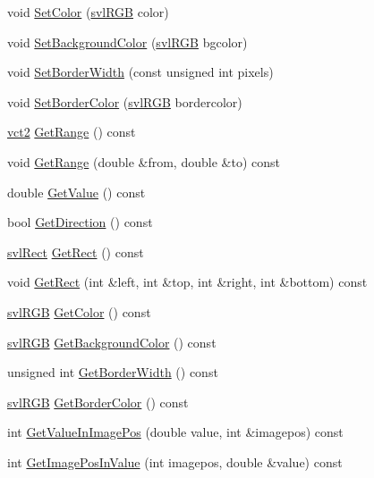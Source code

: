 \begin{DoxyCompactItemize}
\item 
void \hyperlink{classsvl_overlay_static_bar_a1742ec191bd0a3d669d50886f5001322}{Set\-Color} (\hyperlink{structsvl_r_g_b}{svl\-R\-G\-B} color)
\item 
void \hyperlink{classsvl_overlay_static_bar_afe51822052b88ee25f82c8c92978c2ff}{Set\-Background\-Color} (\hyperlink{structsvl_r_g_b}{svl\-R\-G\-B} bgcolor)
\item 
void \hyperlink{classsvl_overlay_static_bar_a49439436a1c7cf6fb6df040010a14a57}{Set\-Border\-Width} (const unsigned int pixels)
\item 
void \hyperlink{classsvl_overlay_static_bar_a1091a5db22ba4897ab10d8332fcfcae8}{Set\-Border\-Color} (\hyperlink{structsvl_r_g_b}{svl\-R\-G\-B} bordercolor)
\item 
\hyperlink{vct_fixed_size_vector_types_8h_a88481ac3c794867ba5e4e92624f0d958}{vct2} \hyperlink{classsvl_overlay_static_bar_a6652291c391a869141ecab8a2b34e559}{Get\-Range} () const 
\item 
void \hyperlink{classsvl_overlay_static_bar_a331674cb3f309f1f5e833bce5c9d7342}{Get\-Range} (double \&from, double \&to) const 
\item 
double \hyperlink{classsvl_overlay_static_bar_a98ed4083a0b9303dd0df841140e18a49}{Get\-Value} () const 
\item 
bool \hyperlink{classsvl_overlay_static_bar_a388519c550f3102ef0c7fbffe4afb1e9}{Get\-Direction} () const 
\item 
\hyperlink{structsvl_rect}{svl\-Rect} \hyperlink{classsvl_overlay_static_bar_afe7c2f05bfbf77fb571a9a75892cd8d1}{Get\-Rect} () const 
\item 
void \hyperlink{classsvl_overlay_static_bar_ad7e626e120a6b3a58b7b5b1f6f37e33c}{Get\-Rect} (int \&left, int \&top, int \&right, int \&bottom) const 
\item 
\hyperlink{structsvl_r_g_b}{svl\-R\-G\-B} \hyperlink{classsvl_overlay_static_bar_a7da9a6ec2e95cfc0c5114a20a9f78d17}{Get\-Color} () const 
\item 
\hyperlink{structsvl_r_g_b}{svl\-R\-G\-B} \hyperlink{classsvl_overlay_static_bar_a80be61d5d70e6ecd29bd71734a8f54de}{Get\-Background\-Color} () const 
\item 
unsigned int \hyperlink{classsvl_overlay_static_bar_a6d83a014c144d31d9e09090f72ae7a55}{Get\-Border\-Width} () const 
\item 
\hyperlink{structsvl_r_g_b}{svl\-R\-G\-B} \hyperlink{classsvl_overlay_static_bar_a38ae1dc8457696e27ea4fbb8937bc5f4}{Get\-Border\-Color} () const 
\item 
int \hyperlink{classsvl_overlay_static_bar_a2964e9c74091eb342126df5bbe37da34}{Get\-Value\-In\-Image\-Pos} (double value, int \&imagepos) const 
\item 
int \hyperlink{classsvl_overlay_static_bar_a0a8cda260ff1f145d0527012f9823e9a}{Get\-Image\-Pos\-In\-Value} (int imagepos, double \&value) const 
\end{DoxyCompactItemize}
